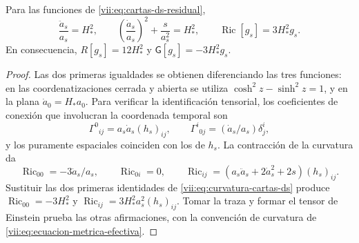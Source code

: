 \begin{lemma}
\label{vii:lem:curvatura-cartas-ds}
Para las funciones de \eqref{vii:eq:cartas-ds-residual},
\begin{equation}
 \frac{\ddot a_s}{a_s}=H_*^2,\qquad
 \left(\frac{\dot a_s}{a_s}\right)^2+\frac{s}{a_s^2}=H_*^2,
 \qquad
 \operatorname{Ric}[g_s]=3H_*^2g_s.
 \label{vii:eq:curvatura-cartas-ds}
\end{equation}
En consecuencia, \(R[g_s]=12H_*^2\) y
\(\mathsf G[g_s]=-3H_*^2g_s\).
\end{lemma}
\begin{proof}
Las dos primeras igualdades se obtienen diferenciando las tres funciones:
en las coordenatizaciones cerrada y abierta se utiliza
\(\cosh^2z-\sinh^2z=1\), y en la plana
\(\dot a_0=H_*a_0\). Para verificar la identificación tensorial,
los coeficientes de conexión que involucran la coordenada temporal son
\[
 \Gamma^0{}_{ij}=a_s\dot a_s(h_s)_{ij},\qquad
 \Gamma^i{}_{0j}=(\dot a_s/a_s)\delta^i_j,
\]
y los puramente espaciales coinciden con los de \(h_s\).
La contracción de la curvatura da
\[
 \operatorname{Ric}_{00}=-3\ddot a_s/a_s,\qquad
 \operatorname{Ric}_{0i}=0,\qquad
 \operatorname{Ric}_{ij}
  =(a_s\ddot a_s+2\dot a_s^2+2s)(h_s)_{ij}.
\]
Sustituir las dos primeras identidades de
\eqref{vii:eq:curvatura-cartas-ds} produce
\(\operatorname{Ric}_{00}=-3H_*^2\) y
\(\operatorname{Ric}_{ij}=3H_*^2a_s^2(h_s)_{ij}\).
Tomar la traza y formar el tensor de Einstein prueba las otras
afirmaciones, con la convención de curvatura de
\eqref{vii:eq:ecuacion-metrica-efectiva}.
\end{proof}

